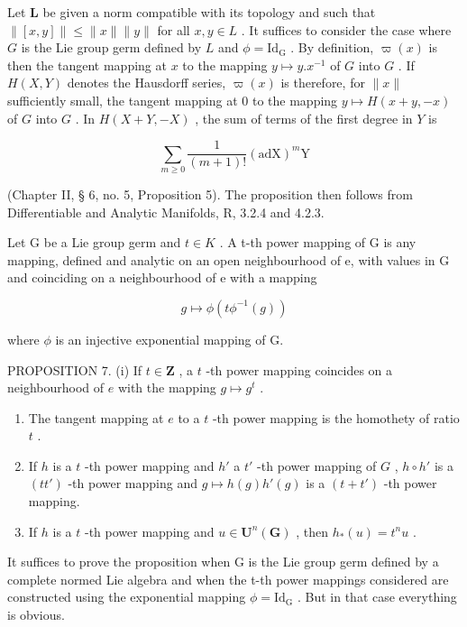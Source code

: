 Let \(\mathbf{L}\) be given a norm compatible with its topology and such that \(\| [x,y]\| \leqslant \| x\| \| y\|\) for all \(x,y\in L\) . It suffices to consider the case where \(G\) is the Lie group germ defined by \(L\) and \(\phi = \mathrm{Id}_{\mathrm{G}}\) . By definition, \(\varpi (x)\) is then the tangent mapping at \(x\) to the mapping \(y\mapsto y.x^{-1}\) of \(G\) into \(G\) . If \(H(X,Y)\) denotes the Hausdorff series, \(\varpi (x)\) is therefore, for \(\| x\|\) sufficiently small, the tangent mapping at 0 to the mapping \(y\mapsto H(x + y, - x)\) of \(G\) into \(G\) . In \(H(X + Y, - X)\) , the sum of terms of the first degree in \(Y\) is

\[
\sum_ {m \geqslant 0} \frac {1}{(m + 1) !} (\mathrm{adX}) ^ {m} \mathrm{Y}
\]

(Chapter II, § 6, no. 5, Proposition 5). The proposition then follows from Differentiable and Analytic Manifolds, R, 3.2.4 and 4.2.3.

Let G be a Lie group germ and \(t \in K\) . A t-th power mapping of G is any mapping, defined and analytic on an open neighbourhood of e, with values in G and coinciding on a neighbourhood of e with a mapping

\[
g \mapsto \phi (t \phi^ {- 1} (g))
\]

where \(\phi\) is an injective exponential mapping of G.

PROPOSITION 7. (i) If \(t \in \mathbf{Z}\) , a \(t\) -th power mapping coincides on a neighbourhood of \(e\) with the mapping \(g \mapsto g^t\) .

\begin{enumerate}
\def\labelenumi{(\roman{enumi})}
\setcounter{enumi}{1}
\item
  The tangent mapping at \(e\) to a \(t\) -th power mapping is the homothety of ratio \(t\) .
\item
  If \(h\) is a \(t\) -th power mapping and \(h'\) a \(t'\) -th power mapping of \(G\) , \(h \circ h'\) is a \((tt')\) -th power mapping and \(g \mapsto h(g)h'(g)\) is a \((t + t')\) -th power mapping.
\item
  If \(h\) is a \(t\) -th power mapping and \(u \in \mathbf{U}^n(\mathbf{G})\) , then \(h_*(u) = t^n u\) .
\end{enumerate}

It suffices to prove the proposition when G is the Lie group germ defined by a complete normed Lie algebra and when the t-th power mappings considered are constructed using the exponential mapping \(\phi = \mathrm{Id}_{\mathrm{G}}\) . But in that case everything is obvious.

